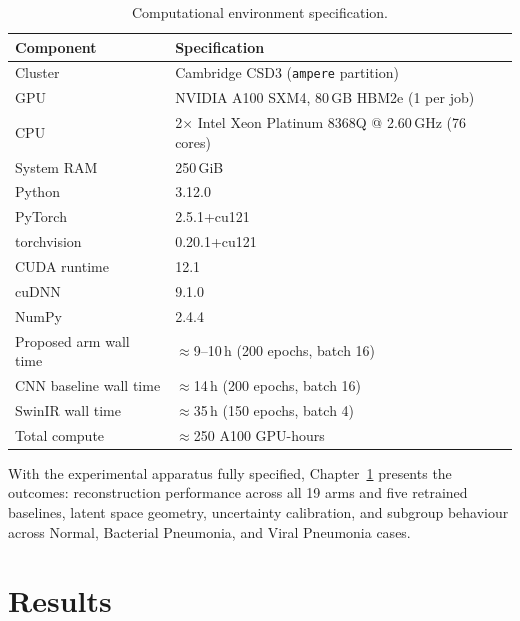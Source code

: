 \documentclass[12pt, a4paper, twoside, openright]{book}
\begin{document}
\begin{table}[H]
  \centering
  \caption{Computational environment specification.}
  \label{tab:methods:compute}
  \begin{tabular}{ll}
    \toprule
    \textbf{Component} & \textbf{Specification} \\
    \midrule
    Cluster            & Cambridge CSD3 (\texttt{ampere} partition) \\
    GPU                & NVIDIA A100 SXM4, 80\,GB HBM2e (1 per job) \\
    CPU                & 2$\times$ Intel Xeon Platinum 8368Q @ 2.60\,GHz (76 cores) \\
    System RAM         & 250\,GiB \\
    \midrule
    Python             & 3.12.0 \\
    PyTorch            & 2.5.1+cu121 \\
    torchvision        & 0.20.1+cu121 \\
    CUDA runtime       & 12.1 \\
    cuDNN              & 9.1.0 \\
    NumPy              & 2.4.4 \\
    \midrule
    Proposed arm wall time   & $\approx$9--10\,h (200 epochs, batch 16) \\
    CNN baseline wall time   & $\approx$14\,h (200 epochs, batch 16) \\
    SwinIR wall time         & $\approx$35\,h (150 epochs, batch 4) \\
    Total compute            & $\approx$250 A100 GPU-hours \\
    \bottomrule
  \end{tabular}
\end{table}

With the experimental apparatus fully specified, Chapter~\ref{chap:results} presents the outcomes: reconstruction performance across all 19 arms and five retrained baselines, latent space geometry, uncertainty calibration, and subgroup behaviour across Normal, Bacterial Pneumonia, and Viral Pneumonia cases.

\chapter{Results}
\label{chap:results}
\end{document}

